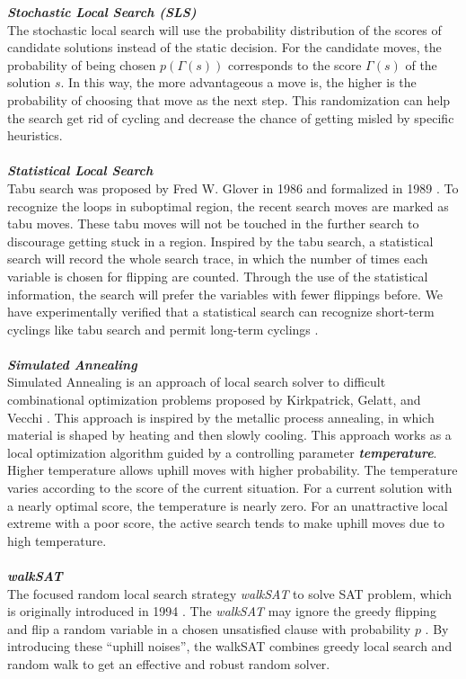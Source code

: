 \documentclass[12pt,a4paper,twoside]{scrartcl}
\numberwithin{equation}{section}
\begin{document}
\emph{\textbf{Stochastic Local Search (SLS)}}\\
The stochastic local search will use the probability distribution of the scores of candidate solutions instead of the static decision. For the candidate moves, the probability of being chosen $p(\Gamma(s))$ corresponds to the score $\Gamma(s)$ of the solution $s$. In this way, the more advantageous a move is, the higher is the probability of choosing that move as the next step. This randomization can help the search get rid of cycling and decrease the chance of getting misled by specific heuristics.\\
\\
\emph{\textbf{Statistical Local Search }}\\
 Tabu search was proposed by Fred W. Glover in 1986 and formalized in 1989 \cite{glover1989tabu}. To recognize the loops in suboptimal region, the recent search moves are marked as tabu moves. These tabu moves will not be touched in the further search to discourage getting stuck in a region. Inspired by the tabu search, a statistical search will record the whole search trace, in which the number of times each variable is chosen for flipping are counted. Through the use of the statistical information, the search will prefer the variables with fewer flippings before. We have experimentally verified that a statistical search can recognize short-term cyclings like tabu search and permit long-term cyclings \cite{lisolving}.\\
\\
\emph{\textbf{Simulated Annealing}}\\
Simulated Annealing is an approach of local search solver to difficult combinational optimization problems proposed by Kirkpatrick, Gelatt, and Vecchi \cite{kirkpatrick1983optimization}. This approach is inspired by the metallic process annealing, in which material is shaped by heating and then slowly cooling. This approach works as a local optimization algorithm guided by a controlling parameter \emph{\textbf{temperature}}. Higher temperature allows uphill moves with higher probability. The temperature varies according to the score of the current situation.  For a current solution with a nearly optimal score, the temperature is nearly zero. For an unattractive local extreme with a poor score, the active search tends to make uphill moves due to high temperature.\\
\\
\emph{\textbf{walkSAT}}\\
The focused random local search strategy \emph{walkSAT} to solve SAT problem, which is originally introduced in 1994 \cite{hoos2002adaptive}. The \emph{walkSAT} may ignore the greedy flipping and flip a random variable in a chosen unsatisfied clause with probability $p$ . By introducing these ``uphill noises'', the walkSAT combines greedy local search and random walk to get an effective and robust random solver. \\
\end{document}
